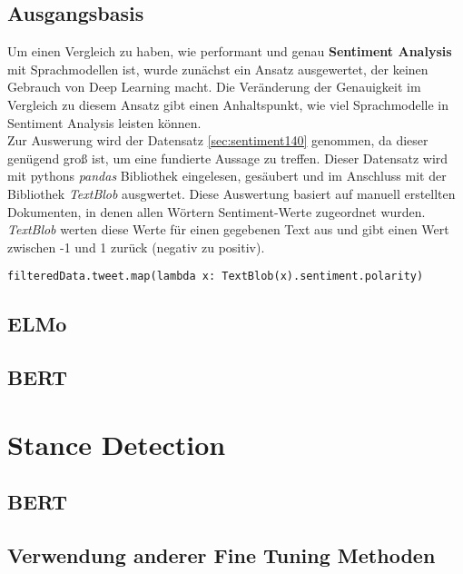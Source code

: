 \subsection{Ausgangsbasis}
Um einen Vergleich zu haben, wie performant und genau \textbf{Sentiment Analysis} mit Sprachmodellen ist, wurde zun\"achst ein Ansatz ausgewertet, der keinen Gebrauch von Deep Learning macht. Die Ver\"anderung der Genauigkeit im Vergleich zu diesem Ansatz gibt einen Anhaltspunkt, wie viel Sprachmodelle in Sentiment Analysis leisten k\"onnen.\\
Zur Auswerung wird der Datensatz \ref{sec:sentiment140} genommen, da dieser gen\"ugend gro{\ss} ist, um eine fundierte Aussage zu treffen. Dieser Datensatz wird mit pythons \textit{pandas} Bibliothek eingelesen, ges\"aubert und im Anschluss mit der Bibliothek \textit{TextBlob} ausgwertet. Diese Auswertung basiert auf manuell erstellten Dokumenten, in denen allen W\"ortern Sentiment-Werte zugeordnet wurden. \textit{TextBlob} werten diese Werte f\"ur einen gegebenen Text aus und gibt einen Wert zwischen -1 und 1 zur\"uck (negativ zu positiv).
\lstset{language=Python}
\lstset{frame=lines}
\lstset{captionpos=b}
\lstset{basicstyle=\footnotesize}
\begin{lstlisting}
filteredData.tweet.map(lambda x: TextBlob(x).sentiment.polarity)
\end{lstlisting}

\subsection{ELMo}

\subsection{BERT}



\section{Stance Detection}

\subsection{BERT}

\subsection{Verwendung anderer Fine Tuning Methoden}